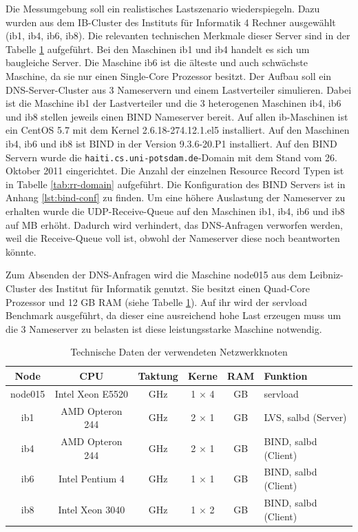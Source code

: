 \documentclass[a4paper, 12pt, BCOR10mm, DIV12, toc=bibliography, toc=listof, german]{scrbook}
\begin{document}
		Die Messumgebung soll ein realistisches Lastszenario wiederspiegeln. Dazu wurden aus dem
		IB-Cluster des Instituts für Informatik 4 Rechner ausgewählt (ib1, ib4, ib6, ib8). Die
		relevanten technischen Merkmale dieser Server sind in der Tabelle \ref{tab:netzwerkknoten}
		aufgeführt. Bei den	Maschinen ib1 und ib4 handelt es sich um baugleiche Server. Die Maschine ib6
		ist die älteste und auch schwächste Maschine, da sie nur einen Single-Core Prozessor besitzt.
		Der Aufbau soll ein DNS-Server-Cluster aus 3 Nameservern und einem Lastverteiler simulieren.
		Dabei ist die Maschine ib1 der Lastverteiler und die 3 heterogenen Maschinen ib4, ib6 und ib8
		stellen jeweils einen BIND Nameserver bereit.	Auf allen ib-Maschinen ist ein CentOS 5.7 mit dem
		Kernel 2.6.18-274.12.1.el5 installiert.  Auf den Maschinen ib4, ib6 und ib8 ist BIND in der
		Version 9.3.6-20.P1 installiert. Auf den BIND Servern wurde die
		\texttt{haiti.cs.uni-potsdam.de}-Domain mit dem Stand vom 26. Oktober 2011 eingerichtet. Die
		Anzahl der einzelnen Resource Record Typen ist in Tabelle \ref{tab:rr-domain} aufgeführt. Die
		Konfiguration des BIND Servers ist in Anhang \ref{lst:bind-conf} zu finden. Um eine höhere
		Auslastung der Nameserver zu erhalten wurde die UDP-Receive-Queue auf den Maschinen ib1, ib4,
		ib6 und ib8 auf \unit[24]{MB} erhöht. Dadurch wird verhindert, das DNS-Anfragen verworfen
		werden, weil die Receive-Queue voll ist, obwohl der Nameserver diese noch beantworten könnte.
		
		Zum Absenden der DNS-Anfragen wird die Maschine node015 aus dem Leibniz-Cluster des Institut für
		Informatik genutzt. Sie besitzt einen Quad-Core Prozessor und 12 GB RAM (siehe Tabelle
		\ref{tab:netzwerkknoten}). Auf ihr wird der servload Benchmark ausgeführt, da dieser eine
		ausreichend hohe Last erzeugen muss um die 3 Nameserver zu belasten ist diese leistungsstarke
		Maschine notwendig.

		\begin{table}
			\centering
			\begin{tabular}{|c|c|c|c|c|l|}\hline
				Node & CPU &  Taktung & Kerne & RAM & Funktion \\\hline\hline
				node015 & Intel Xeon E5520 & \unit[2,27]{GHz} & 1 $\times$ 4 & \unit[12]{GB} & servload\\
				ib1 & AMD Opteron 244 & \unit[1,8]{GHz} & 2 $\times$ 1 & \unit[4]{GB} & LVS, salbd (Server)\\
				ib4 & AMD Opteron 244 & \unit[1,8]{GHz} & 2 $\times$ 1 & \unit[4]{GB} & BIND, salbd (Client)\\
				ib6 & Intel Pentium 4 & \unit[2,8]{GHz} & 1 $\times$ 1 & \unit[4]{GB} & BIND, salbd (Client)\\
				ib8 & Intel Xeon 3040 & \unit[1,86]{GHz} & 1 $\times$ 2 & \unit[4]{GB} & BIND, salbd (Client)\\\hline
			\end{tabular}
			\caption{Technische Daten der verwendeten Netzwerkknoten}
			\label{tab:netzwerkknoten}
		\end{table}
\end{document}
